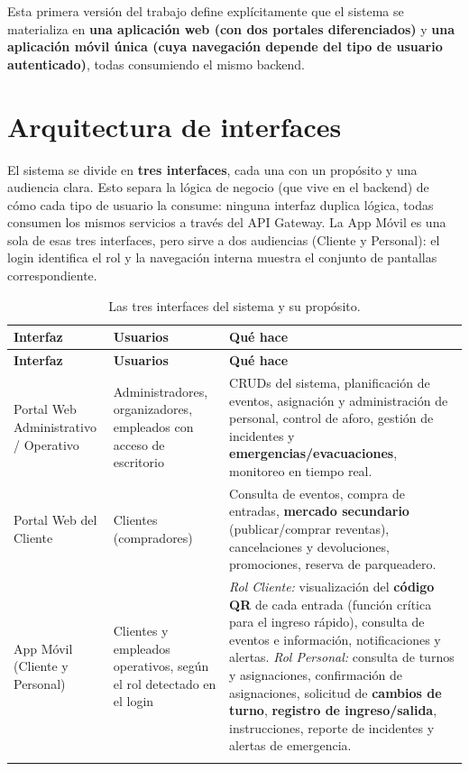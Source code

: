 \documentclass[12pt,a4paper]{article}
\begin{document}
Esta primera versión del trabajo define explícitamente que el sistema se materializa en
\textbf{una aplicación web (con dos portales diferenciados)} y \textbf{una aplicación móvil única
(cuya navegación depende del tipo de usuario autenticado)}, todas consumiendo el mismo backend.

\section{Arquitectura de interfaces}

El sistema se divide en \textbf{tres interfaces}, cada una con un propósito y una audiencia
clara. Esto separa la lógica de negocio (que vive en el backend) de cómo cada tipo de usuario la
consume: ninguna interfaz duplica lógica, todas consumen los mismos servicios a través del API
Gateway. La App Móvil es una sola de esas tres interfaces, pero sirve a dos audiencias (Cliente y
Personal): el login identifica el rol y la navegación interna muestra el conjunto de pantallas
correspondiente.

\begin{longtable}{p{3.3cm}p{3.2cm}p{7.5cm}}
\toprule
\textbf{Interfaz} & \textbf{Usuarios} & \textbf{Qué hace}\\
\midrule
\endfirsthead
\toprule
\textbf{Interfaz} & \textbf{Usuarios} & \textbf{Qué hace}\\
\midrule
\endhead
Portal Web Administrativo / Operativo &
Administradores, organizadores, empleados con acceso de escritorio &
CRUDs del sistema, planificación de eventos, asignación y administración de personal, control de
aforo, gestión de incidentes y \textbf{emergencias/evacuaciones}, monitoreo en tiempo real.\\[0.4em]
Portal Web del Cliente &
Clientes (compradores) &
Consulta de eventos, compra de entradas, \textbf{mercado secundario} (publicar/comprar
reventas), cancelaciones y devoluciones, promociones, reserva de parqueadero.\\[0.4em]
App Móvil (Cliente y Personal) &
Clientes y empleados operativos, según el rol detectado en el login &
\textit{Rol Cliente:} visualización del \textbf{código QR} de cada entrada (función crítica para
el ingreso rápido), consulta de eventos e información, notificaciones y alertas.
\textit{Rol Personal:} consulta de turnos y asignaciones, confirmación de asignaciones, solicitud
de \textbf{cambios de turno}, \textbf{registro de ingreso/salida}, instrucciones, reporte de
incidentes y alertas de emergencia.\\
\bottomrule
\caption{Las tres interfaces del sistema y su propósito.}
\end{longtable}
\end{document}

